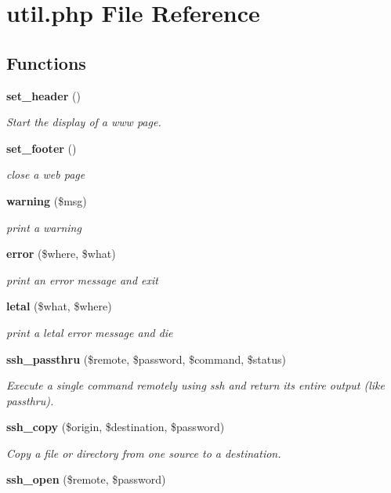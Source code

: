 \section{util.php File Reference}
\label{util_8php}
\subsection*{Functions}
\begin{CompactItemize}
\item 
{\bf set\_\-header} ()
\begin{CompactList}\small\item\em Start the display of a www page. \item\end{CompactList}\item 
{\bf set\_\-footer} ()
\begin{CompactList}\small\item\em close a web page \item\end{CompactList}\item 
{\bf warning} (\$msg)
\begin{CompactList}\small\item\em print a warning \item\end{CompactList}\item 
{\bf error} (\$where, \$what)
\begin{CompactList}\small\item\em print an error message and exit \item\end{CompactList}\item 
{\bf letal} (\$what, \$where)
\begin{CompactList}\small\item\em print a letal error message and die \item\end{CompactList}\item 
{\bf ssh\_\-passthru} (\$remote, \$password, \$command, \$status)
\begin{CompactList}\small\item\em Execute a single command remotely using ssh and return its entire output (like passthru). \item\end{CompactList}\item 
{\bf ssh\_\-copy} (\$origin, \$destination, \$password)
\begin{CompactList}\small\item\em Copy a file or directory from one source to a destination. \item\end{CompactList}\item 
{\bf ssh\_\-open} (\$remote, \$password)
\end{CompactItemize}



